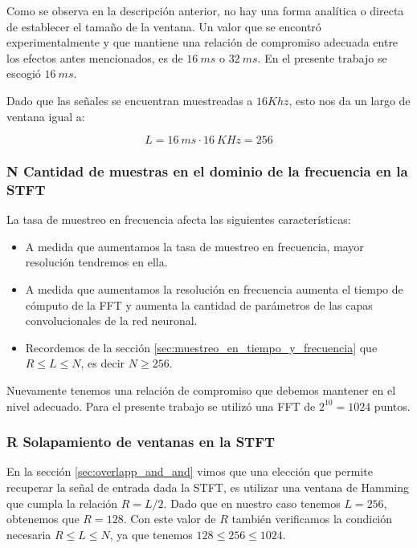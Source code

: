 Como se observa en la descripción anterior, no hay una forma analítica o directa de establecer el tamaño de la ventana. Un valor que se encontró experimentalmente y que mantiene una relación de compromiso adecuada entre los efectos antes mencionados, es de $\SI{16}{ms}$ o $\SI{32}{ms}$. En el presente trabajo se escogió $\SI{16}{ms}$.

Dado que las señales se encuentran muestreadas a $16 Khz$, esto nos da un largo de ventana igual a:

\begin{equation*}
	L = \SI{16}{ms} \cdot \SI{16}{KHz} = 256
\end{equation*}

\subsubsection{N Cantidad de muestras en el dominio de la frecuencia en la STFT}
\label{sec:cantidad_muestras_frecuencia}

La tasa de muestreo en frecuencia afecta las siguientes características:

\begin{itemize}
	\item A medida que aumentamos la tasa de muestreo en frecuencia, mayor resolución tendremos en ella.
	\item A medida que aumentamos la resolución en frecuencia aumenta el tiempo de cómputo de la FFT y aumenta la cantidad de parámetros de las capas convolucionales de la red neuronal.
	\item Recordemos de la sección \ref{sec:muestreo_en_tiempo_y_frecuencia} que $R \leq L \leq N$, es decir $N \ge 256$.
\end{itemize}

Nuevamente tenemos una relación de compromiso que debemos mantener en el nivel adecuado. Para el presente trabajo se utilizó una FFT de $2^{10} = 1024$ puntos. 

\subsubsection{R Solapamiento de ventanas en la STFT}

En la sección \ref{sec:overlapp_and_and} vimos que una elección que permite recuperar la señal de entrada dada la STFT, es utilizar una ventana de Hamming que cumpla la relación $R = L/2$. Dado que en nuestro caso tenemos $L = 256$, obtenemos que $R=128$. Con este valor de $R$ también verificamos la condición necesaria $R \leq L \leq N$, ya que tenemos $128 \leq 256 \leq 1024$.

